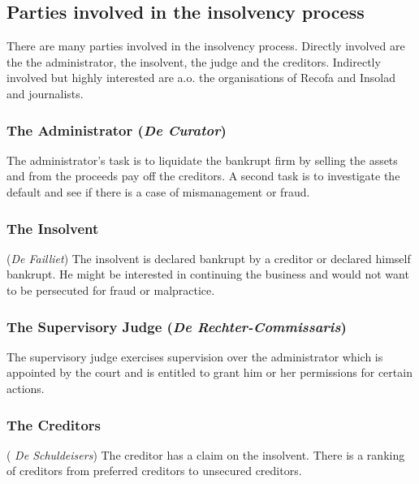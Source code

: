 
\subsection{Parties involved in the insolvency process}
There are many parties involved in the insolvency process. Directly involved are the the administrator, the insolvent, the judge and the creditors. Indirectly involved but highly interested are a.o. the organisations of Recofa and Insolad and journalists. 

\subsubsection{The Administrator (\textit{De Curator})}
The administrator's task is to liquidate the bankrupt firm by selling the assets and from the proceeds pay off the creditors. A second task is to investigate the default and see if there is a case of mismanagement or fraud.

\subsubsection{The Insolvent} (\textit{De Failliet})
The insolvent is declared bankrupt by a creditor or declared himself bankrupt. He might be interested in continuing the business and would not want to be persecuted for fraud or malpractice.

\subsubsection{The Supervisory Judge (\textit{De Rechter-Commissaris})}
The supervisory judge exercises supervision over the administrator which is appointed by the court and is entitled to grant him or her permissions for certain actions.

\subsubsection{The Creditors}( \textit{De Schuldeisers})
The creditor has a claim on the insolvent. There is a ranking of creditors from preferred creditors to unsecured creditors.

